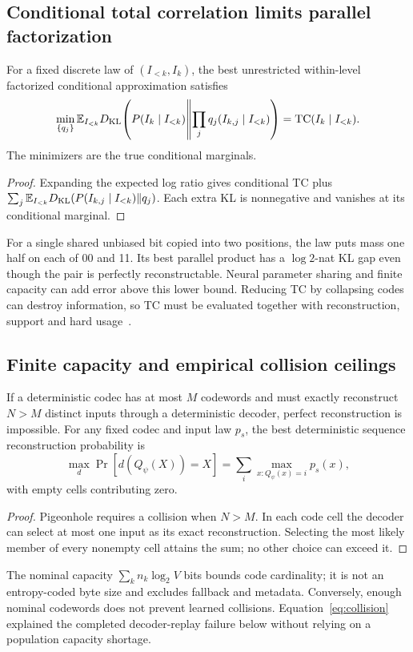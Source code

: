\documentclass[11pt,a4paper]{article}
\begin{document}
\subsection{Conditional total correlation limits parallel factorization}
\begin{proposition}
For a fixed discrete law of \((I_{<k},I_k)\), the best unrestricted within-level
factorized conditional approximation satisfies
\begin{equation}
 \min_{\{q_j\}}\mathbb E_{I_{<k}}
 D_{\rm KL}\!\left(P(I_k\mid I_{<k})\middle\|\prod_jq_j(I_{k,j}\mid I_{<k})\right)
 =\mathrm{TC}(I_k\mid I_{<k}).
\end{equation}
The minimizers are the true conditional marginals.
\end{proposition}
\begin{proof}
Expanding the expected log ratio gives conditional TC plus
\(\sum_j\mathbb E_{I_{<k}}D_{\rm KL}(P(I_{k,j}\mid I_{<k})\|q_j)\).
Each extra KL is nonnegative and vanishes at its conditional marginal.
\end{proof}
For a single shared unbiased bit copied into two positions, the law puts mass
one half on each of 00 and 11. Its best parallel product has a \(\log 2\)-nat
KL gap even though the pair is perfectly reconstructable. Neural parameter
sharing and finite capacity can add error above this lower bound. Reducing TC
by collapsing codes can destroy information, so TC must be evaluated together
with reconstruction, support and hard usage~\citep{wen2026parallel}.

\subsection{Finite capacity and empirical collision ceilings}
\begin{proposition}
If a deterministic codec has at most \(M\) codewords and must exactly reconstruct
\(N>M\) distinct inputs through a deterministic decoder, perfect reconstruction
is impossible. For any fixed codec and input law \(p_s\), the best deterministic
sequence reconstruction probability is
\begin{equation}
 \max_{d}\Pr[d(Q_\psi(X))=X]
   =\sum_i\max_{x:Q_\psi(x)=i}p_s(x),
 \label{eq:collision}
\end{equation}
with empty cells contributing zero.
\end{proposition}
\begin{proof}
Pigeonhole requires a collision when \(N>M\). In each code cell the decoder can
select at most one input as its exact reconstruction. Selecting the most likely
member of every nonempty cell attains the sum; no other choice can exceed it.
\end{proof}
The nominal capacity \(\sum_k n_k\log_2V\) bits bounds code cardinality; it is
not an entropy-coded byte size and excludes fallback and metadata. Conversely,
enough nominal codewords does not prevent learned collisions. Equation~\eqref{eq:collision}
explained the completed decoder-replay failure below without relying on a
population capacity shortage.
\end{document}
